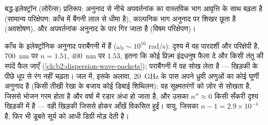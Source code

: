 \begin{omfigure}

{\small बद्ध-इलेक्ट्रॉन (लोरेंत्स) प्रतिरूप: अनुनाद से नीचे अपवर्तनांक का
वास्तविक भाग आवृत्ति के साथ बढ़ता है (सामान्य परिक्षेपण: काँच में बैंगनी
लाल से धीमा है), काल्पनिक भाग अनुनाद पर शिखर छूता है
(अवशोषण), और अपवर्तनांक अनुनाद के पार गिर जाता है
(विषम परिक्षेपण)।}
\end{omfigure}

\begin{example}[काँच, जल, वायु]\label{ex:b2:waves-in-media:dielectrics}
काँच के इलेक्ट्रॉनिक अनुनाद पराबैंगनी में हैं ($\omega_0 \sim 10^{16}$
rad/s): दृश्य में वह पारदर्शी और परिक्षेपी है, \qty{700}{nm} पर $n = 1.51$,
\qty{400}{nm} पर $1.53$, इतना कि कोई प्रिज़्म इंद्रधनुष फैला दे
और किसी तंतु की स्पंदें फैल जाएँ (\cref{ch:b2:dispersion-wave-packets});
पराबैंगनी में वह सोख लेता है --- खिड़की के पीछे धूप से रंग नहीं चढ़ता।
जल में, इसके अलावा, \qty{20}{GHz} के पास अपने ध्रुवी अणुओं का कोई घूर्णी
अनुनाद है (किसी तीखी रेखा के बजाय कोई डिबाई शिथिलन): वह सूक्ष्मतरंगों को
ज़ोर से सोखता है, जिससे भोजन गरम होता है और वर्षा में रडार अंधा हो जाता है,
और उसका $n'' \approx 0$ किसी सँकरी दृश्य खिड़की में है --- वही खिड़की जिससे
होकर आँखें विकसित हुईं। वायु, जिसका $n - 1 = 2.9 \times 10^{-4}$ है, फिर भी
डूबते सूर्य को आधी डिग्री मोड़ देती है।
\end{example}

